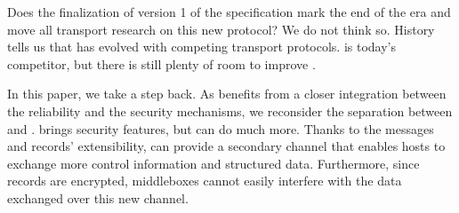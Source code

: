 Does the finalization of version 1 of the \quic specification mark the
end of the \tcp era and move all transport research on this new protocol?
We do not think so. History tells us that \tcp has evolved with competing
transport protocols. \quic is today's competitor, but there is still plenty of
room to improve \tcp.

In this paper, we take a step back. As \quic benefits from a closer integration between the reliability and the security mechanisms, we reconsider the separation between \tcp and \tls.
\tls brings security features, but  can do much more. Thanks to the  messages and records' extensibility, \tls can provide a secondary channel that enables hosts to exchange more control information and structured data. Furthermore, since \tls records are encrypted, middleboxes cannot easily interfere with the data exchanged over this new channel.



